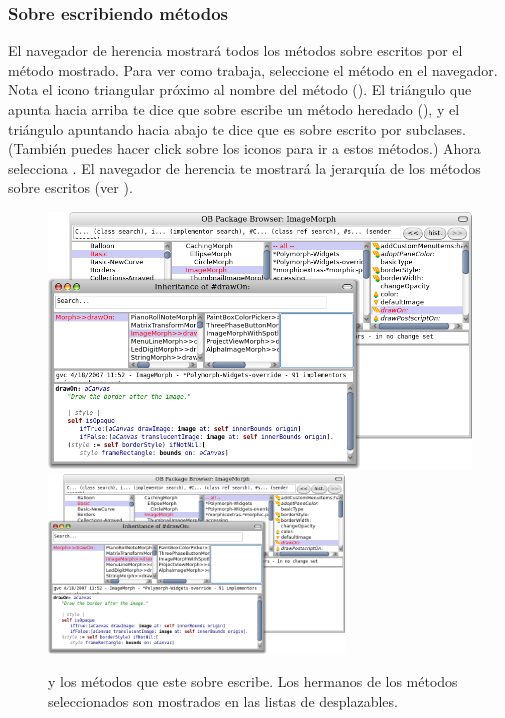 \documentclass[spanish,a4paper,10pt,twoside]{book}
\begin{document}

\subsubsection{Sobre escribiendo m\'etodos}

El navegador de herencia mostrar\'a todos los m\'etodos sobre escritos por el m\'etodo mostrado.
Para ver como trabaja, seleccione el m\'etodo  en el navegador.
Nota el icono triangular pr\'oximo al nombre del m\'etodo ().
El tri\'angulo que apunta hacia arriba te dice que  sobre escribe un m\'etodo heredado (\ie {}), y el tri\'angulo apuntando hacia abajo te dice que es sobre escrito por subclases. (Tambi\'en puedes hacer click sobre los iconos para ir a estos m\'etodos.)
Ahora selecciona .
El navegador de herencia te mostrar\'a la jerarqu\'ia de los m\'etodos sobre escritos (ver ).

\begin{figure}[btp]
	\begin{center}
   \ifluluelse
		{\includegraphics[width=\textwidth]{OBInheritanceOverriding}}
		{\includegraphics[width=0.7\textwidth]{OBInheritanceOverriding}}
	\end{center}
	\caption{ y los m\'etodos que este sobre escribe. Los hermanos de los m\'etodos seleccionados son mostrados en las listas de desplazables.}
\end{figure}
\end{document}
